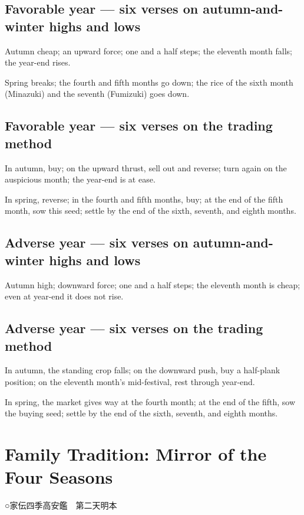 \documentclass[10pt, openany]{book}
\newcommand{\jp}[1]{{\japanesefont #1}}
\begin{document}
\subsection*{Favorable year --- six verses on autumn-and-winter highs and lows}

Autumn cheap; an upward force; one and a half steps; the eleventh
month falls; the year-end rises.

Spring breaks; the fourth and fifth months go down; the rice of the
sixth month (Minazuki) and the seventh (Fumizuki) goes down.

\subsection*{Favorable year --- six verses on the trading method}

In autumn, buy; on the upward thrust, sell out and reverse; turn
again on the auspicious month; the year-end is at ease.

In spring, reverse; in the fourth and fifth months, buy; at the end
of the fifth month, sow this seed; settle by the end of the sixth,
seventh, and eighth months.

\subsection*{Adverse year --- six verses on autumn-and-winter highs and lows}

Autumn high; downward force; one and a half steps; the eleventh
month is cheap; even at year-end it does not rise.

\subsection*{Adverse year --- six verses on the trading method}

In autumn, the standing crop falls; on the downward push, buy a
half-plank position; on the eleventh month's mid-festival, rest
through year-end.

In spring, the market gives way at the fourth month; at the end of
the fifth, sow the buying seed; settle by the end of the sixth,
seventh, and eighth months.

\section{Family Tradition: Mirror of the Four Seasons}

\begin{center}
\jp{○家伝四季高安鑑　第二天明本}
\end{center}
\end{document}
